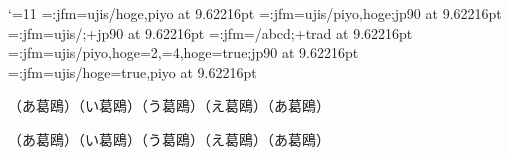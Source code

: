 
\catcode`\@=11
\jfont \testA=\ltj@stdmcfont:jfm=ujis/hoge,piyo at 9.62216pt
\jfont \testB=\ltj@stdmcfont:jfm=ujis/piyo,hoge;jp90 at 9.62216pt
\jfont \testC=\ltj@stdgtfont:jfm=ujis/;+jp90 at 9.62216pt
\jfont \testD=\ltj@stdgtfont:jfm=/abcd;+trad at 9.62216pt %
\jfont \testE=\ltj@stdmcfont:jfm=ujis/piyo,hoge=2,=4,hoge=true;jp90 at 9.62216pt
\jfont \testF=\ltj@stdmcfont:jfm=ujis/hoge=true,piyo at 9.62216pt


{\testA （あ葛鴎）}{\testB （い葛鴎）}{\testC （う葛鴎）}（え葛鴎）{\tengt（あ葛鴎）}\par

{\testA （あ葛鴎）}{\testB （い葛鴎）}{\testC （う葛鴎）}（え葛鴎）{\tengt（あ葛鴎）}\par

\bye
